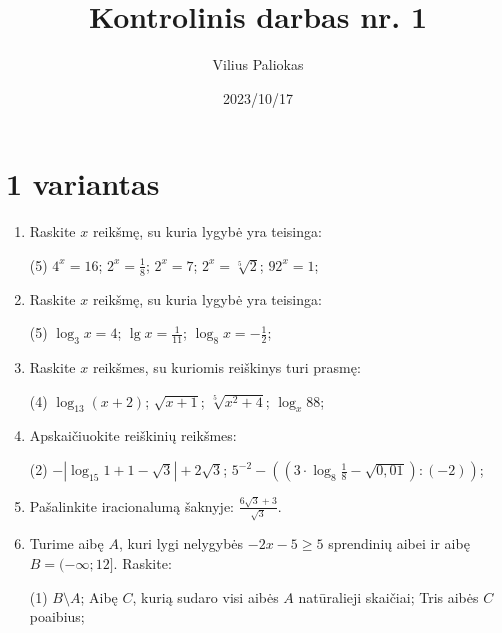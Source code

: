 \documentclass[a4paper]{article}
\title{Kontrolinis darbas nr. 1}
\author{Vilius Paliokas}
\date{2023/10/17}
\begin{document}
\thispagestyle{empty}
\section*{1 variantas}

\begin{enumerate}
      \item Raskite $x$ reikšmę, su kuria lygybė yra teisinga:

            \begin{tasks}[item-format={\normalfont}, after-item-skip=4mm](5)
                  \task $4^{x}=16$;
                  \task $2^{x}=\frac{1}{8}$;
                  \task $2^{x}=7$;
                  \task $2^{x}=\sqrt[5]{2}$;
                  \task $92^{x}=1$;
            \end{tasks}

      \item Raskite $x$  reikšmę, su kuria lygybė yra teisinga:
            \begin{tasks}[item-format={\normalfont}, after-item-skip=4mm](5)
                  \task $\log_{3} x=4$;
                  \task $\lg x=\frac{1}{11}$;
                  \task $\log_{8} x=-\frac{1}{2}$;
            \end{tasks}
      \item Raskite $x$ reikšmes, su kuriomis reiškinys turi prasmę:
            \begin{tasks}[item-format={\normalfont}, after-item-skip=4mm](4)
                  \task $\log_{13} (x+2)$;
                  \task $\sqrt{x+1}$;
                  \task $\sqrt[5]{x^{2}+4}$;
                  \task $\log_{x}88$;
            \end{tasks}
      \item Apskaičiuokite reiškinių reikšmes:
            \begin{tasks}[item-format={\normalfont}, after-item-skip=4mm](2)
                  \task $-\left|\log_{15}1+1-\sqrt{3}\right|+2\sqrt{3}$;
                  \task $5^{-2} - ((3 \cdot
                        \log_{8}\frac{1}{8}-\sqrt{0,01}):(-2))$;
            \end{tasks}

      \item Pašalinkite iracionalumą šaknyje: $\frac{6\sqrt{3}+3}{\sqrt{3}}$.

      \item Turime aibę $A$, kuri lygi nelygybės $-2x-5\geq5$ sprendinių aibei
            ir aibę $B=(-\infty;12]$. Raskite:
            \begin{tasks}[item-format={\normalfont}, after-item-skip=2mm](1)
                  \task $B \setminus A$;
                  \task Aibę $C$, kurią sudaro visi aibės $A$ natūralieji
                  skaičiai;
                  \task Tris aibės $C$ poaibius;
            \end{tasks}
\end{enumerate}
\end{document}

